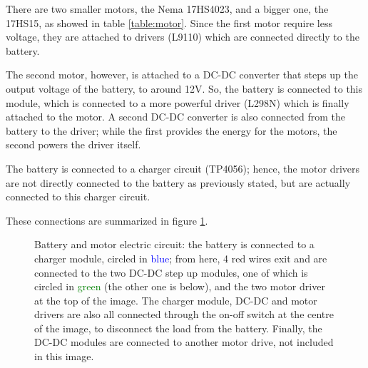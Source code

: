 \documentclass[]{article}
\begin{document}
There are two smaller motors, the Nema 17HS4023, and a bigger one, the 17HS15, as showed in table \ref{table:motor}. Since the first motor require less voltage, they are attached to drivers (L9110) which are connected directly to the battery. 

The second motor, however, is attached to a DC-DC converter that steps up the output voltage of the battery, to around 12V. So, the battery is connected to this module, which is connected to a more powerful driver (L298N) which is finally attached to the motor. A second DC-DC converter is also connected from the battery to the driver; while the first provides the energy for the motors, the second powers the driver itself. 

The battery is connected to a charger circuit (TP4056); hence, the motor drivers are not directly connected to the battery as previously stated, but are actually connected to this charger circuit. 

These connections are summarized in figure \ref{fig:batterycircuit}.

\begin{figure}[h]
	\centering
	\caption{Battery and motor electric circuit: the battery is connected to a charger module, circled in \textcolor{blue}{blue}; from here, 4 red wires exit and are connected to the two DC-DC step up modules, one of which is circled in \textcolor{green}{green} (the other one is below), and the two motor driver at the top of the image. The charger module, DC-DC and motor drivers are also all connected through the on-off switch at the centre of the image, to disconnect the load from the battery. Finally, the DC-DC modules are connected to another motor drive, not included in this image.}
	\label{fig:batterycircuit}
\end{figure}
\end{document}
